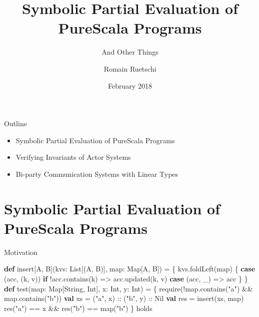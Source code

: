 \documentclass[ignorenonframetext,]{beamer}
\institute{Laboratory for Automated Reasoning and Analysis, EPFL}
\title{Symbolic Partial Evaluation of PureScala Programs}
\subtitle{And Other Things}
\author{Romain Ruetschi}
\date{February 2018}
\newenvironment{Shaded}{}{}
\newcommand{\FunctionTok}[1]{\textcolor[rgb]{0.02,0.16,0.49}{#1}}
\newcommand{\KeywordTok}[1]{\textcolor[rgb]{0.00,0.44,0.13}{\textbf{#1}}}
\newcommand{\NormalTok}[1]{#1}
\newcommand{\StringTok}[1]{\textcolor[rgb]{0.25,0.44,0.63}{#1}}
\providecommand{\tightlist}{%
  \setlength{\itemsep}{0pt}\setlength{\parskip}{0pt}}
\begin{document}
\frame{\titlepage}

\begin{frame}{%
\protect\hypertarget{outline}{%
Outline}}

\begin{itemize}
\tightlist
\item
  Symbolic Partial Evaluation of PureScala Programs
\item
  Verifying Invariants of Actor Systems
\item
  Bi-party Communication Systems with Linear Types
\end{itemize}

\end{frame}

\hypertarget{symbolic-partial-evaluation-of-purescala-programs}{%
\section{Symbolic Partial Evaluation of PureScala
Programs}\label{symbolic-partial-evaluation-of-purescala-programs}}

\begin{frame}[fragile]{%
\protect\hypertarget{motivation}{%
Motivation}}

\begin{Shaded}
\begin{Highlighting}[]
\KeywordTok{def}\NormalTok{ insert[A, B](kvs: List[(A, B)], map: Map[A, B]) = \{}
\NormalTok{  kvs.}\FunctionTok{foldLeft}\NormalTok{(map) \{}
    \KeywordTok{case}\NormalTok{ (acc, (k, v)) }\KeywordTok{if}\NormalTok{ !acc.}\FunctionTok{contains}\NormalTok{(k) =>}
\NormalTok{      acc.}\FunctionTok{updated}\NormalTok{(k, v)}
    \KeywordTok{case}\NormalTok{ (acc, _) => acc}
\NormalTok{  \}}
\NormalTok{\}}
\KeywordTok{def} \FunctionTok{test}\NormalTok{(map: Map[String, Int], x: Int, y: Int) = \{}
  \FunctionTok{require}\NormalTok{(!map.}\FunctionTok{contains}\NormalTok{(}\StringTok{"a"}\NormalTok{) && map.}\FunctionTok{contains}\NormalTok{(}\StringTok{"b"}\NormalTok{))}
  \KeywordTok{val}\NormalTok{ xs = (}\StringTok{"a"}\NormalTok{, x) :: (}\StringTok{"b"}\NormalTok{, y) :: Nil}
  \KeywordTok{val}\NormalTok{ res = }\FunctionTok{insert}\NormalTok{(xs, map)}
  \FunctionTok{res}\NormalTok{(}\StringTok{"a"}\NormalTok{) == x && }\FunctionTok{res}\NormalTok{(}\StringTok{"b"}\NormalTok{) == }\FunctionTok{map}\NormalTok{(}\StringTok{"b"}\NormalTok{)}
\NormalTok{\} holds}
\end{Highlighting}
\end{Shaded}

\end{frame}
\end{document}
